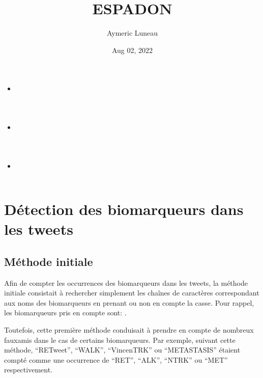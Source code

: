 \documentclass[letterpaper,10pt,english]{jupyterBook}
\title{ESPADON}
\date{Aug 02, 2022}
\author{Aymeric Luneau}
\begin{document}
\pagestyle{empty}
\sphinxmaketitle
\pagestyle{plain}
\sphinxtableofcontents
\pagestyle{normal}
\label{\detokenize{intro::doc}}

\begin{itemize}
\item {} 
\sphinxAtStartPar
{\hyperref[\detokenize{read_sm::doc}]{}}

\item {} 
\sphinxAtStartPar
{\hyperref[\detokenize{regroupement_categorie::doc}]{}}

\item {} 
\sphinxAtStartPar
{\hyperref[\detokenize{analyse_preleminaire::doc}]{}}

\end{itemize}

\sphinxstepscope


\section{Détection des biomarqueurs dans les tweets}
\label{\detokenize{read_sm:detection-des-biomarqueurs-dans-les-tweets}}\label{\detokenize{read_sm::doc}}

\subsection{Méthode initiale}
\label{\detokenize{read_sm:methode-initiale}}
\sphinxAtStartPar
Afin de compter les occurrences des biomarqueurs dans les tweets, la méthode initiale consistait à rechercher simplement les chaînes de caractères correspondant aux noms des biomarqueurs en prenant ou non en compte la casse. Pour rappel, les biomarqueurs pris en compte sont: .

\sphinxAtStartPar
Toutefois, cette première méthode conduisait à prendre en compte de nombreux faux\sphinxhyphen{}amis dans le cas de certains biomarqueurs. Par exemple, suivant cette méthode, “RETweet”, “WALK”, “VincenTRK” ou “METASTASIS” étaient compté comme une occurrence de “RET”, “ALK”, “NTRK” ou “MET” respectivement.
\end{document}

